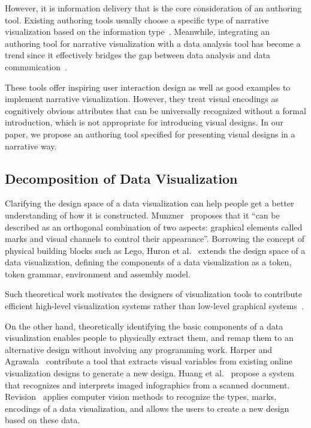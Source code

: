 However, it is information delivery that is the core consideration of an authoring tool. Existing authoring tools usually choose a specific type of narrative visualization based on the information type~\cite{amini_authoring_2017, fulda_timelinecurator:_2016}. Meanwhile, integrating an authoring tool for narrative visualization with a  data analysis tool has become a trend since it effectively bridges the gap between data analysis and data communication~\cite{eccles_stories_2007, bryan_temporal_2016,lee_more_2015}. 
 
These tools offer inspiring user interaction design as well as good examples to implement narrative visualization. However, they treat visual encodings as cognitively obvious attributes that can be universally recognized without a formal introduction, which is not appropriate for introducing visual designs. In our paper, we propose an authoring tool specified for presenting visual designs in a narrative way. 

\subsection{Decomposition of Data Visualization}
Clarifying the design space of a data visualization can help people get a better understanding of how it is constructed. Munzner~\cite{munzner_visualization_2014} proposes that it ``can be described as an orthogonal combination of two aspects: graphical elements called marks and visual channels to control their appearance''. Borrowing the concept of physical building blocks such as Lego, Huron et al.~\cite{huron_constructive_2014} extends the design space of a data visualization, defining the components of a data visualization as a token, token grammar, environment and assembly model.

Such theoretical work motivates the designers of visualization tools to contribute efficient high-level visualization systems rather than low-level graphical systems~\cite{bostock_protovis:_2009,mendez_ivolver:_2016}. 

On the other hand, theoretically identifying the basic components of a data visualization enables people to physically extract them, and remap them to an alternative design without involving any programming work. Harper and Agrawala~\cite{harper_deconstructing_2014} contribute a tool that extracts visual variables from existing online visualization designs to generate a new design. Huang et al.~\cite{Huang:2007:SUI:1284420.1284427} propose a system that recognizes and interprets imaged
infographics from a scanned document. Revision~\cite{savva_revision:_2011} applies computer vision methods to recognize the types, marks, encodings of a data visualization, and allows the users to create a new design based on these data. 

